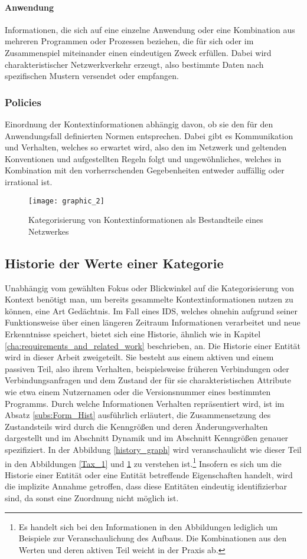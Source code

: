 \paragraph{Anwendung}
Informationen, die sich auf eine einzelne Anwendung oder eine Kombination aus mehreren Programmen oder Prozessen beziehen, die für sich oder im Zusammenspiel miteinander einen eindeutigen Zweck erfüllen. Dabei wird charakteristischer Netzwerkverkehr erzeugt, also bestimmte Daten nach spezifischen Mustern versendet oder empfangen.
\subsubsection{Policies}
Einordnung der Kontextinformationen abhängig davon, ob sie den für den Anwendungsfall definierten Normen entsprechen. Dabei gibt es Kommunikation und Verhalten, welches so erwartet wird, also den im Netzwerk und geltenden Konventionen und aufgestellten Regeln folgt und ungewöhnliches, welches in Kombination mit den vorherrschenden Gegebenheiten entweder auffällig oder irrational ist.
\begin{figure}[H]
\centering
\texttt{[image: graphic\_2]}
\caption{Kategorisierung von Kontextinformationen als Bestandteile eines Netzwerkes}
\label{Tax_2} 
\end{figure}
\subsection{Historie der Werte einer Kategorie}
Unabhängig vom gewählten Fokus oder Blickwinkel auf die Kategorisierung von Kontext benötigt man, um bereits gesammelte Kontextinformationen nutzen zu können, eine Art Gedächtnis. Im Fall eines IDS, welches ohnehin aufgrund seiner Funktionsweise über einen längeren Zeitraum Informationen verarbeitet und neue Erkenntnisse speichert, bietet sich eine Historie, ähnlich wie in Kapitel \ref{cha:requirements_and_related_work} beschrieben, an.
Die Historie einer Entität wird in dieser Arbeit zweigeteilt. Sie besteht aus einem aktiven und einem passiven Teil, also ihrem Verhalten, beispielsweise früheren Verbindungen oder Verbindungsanfragen und dem Zustand der für sie charakteristischen Attribute wie etwa einem Nutzernamen oder die Versionsnummer eines bestimmten Programms.
Durch welche Informationen Verhalten repräsentiert wird, ist im Absatz \ref{subs:Form_Hist} ausführlich erläutert, die Zusammensetzung des Zustandsteils wird durch die Kenngrößen und deren Änderungsverhalten dargestellt und im Abschnitt Dynamik und im Abschnitt Kenngrößen genauer spezifiziert. In der Abbildung \ref{history_graph} wird veranschaulicht wie dieser Teil in den Abbildungen \ref{Tax_1} und \ref{Tax_2} zu verstehen ist.\footnote{Es handelt sich bei den Informationen in den Abbildungen lediglich um Beispiele zur Veranschaulichung des Aufbaus. Die Kombinationen aus den Werten und deren aktiven Teil weicht in der Praxis ab.} Insofern es sich um die Historie einer Entität oder eine Entität betreffende Eigenschaften handelt, wird die implizite Annahme getroffen, dass diese Entitäten eindeutig identifizierbar sind, da sonst eine Zuordnung nicht möglich ist.
